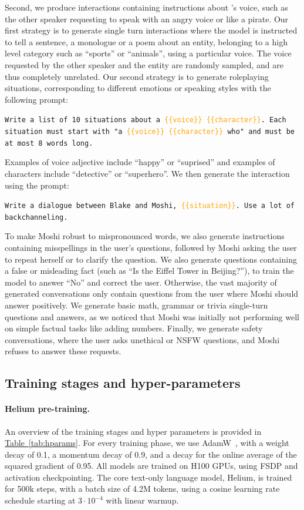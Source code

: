Second, we produce interactions containing instructions about  \ours{}'s voice, such as the other speaker requesting \ours{} to speak with an angry voice or like a pirate.
Our first strategy is to generate single turn interactions where the model is instructed to tell a sentence, a monologue or a poem about an entity, belonging to a high level category such as “sports” or “animals”, using a particular voice.
The voice requested by the other speaker and the entity are randomly sampled, and are thus completely unrelated.
Our second strategy is to generate roleplaying situations, corresponding to different emotions or speaking styles with the following prompt:
\begin{tcolorbox}
  \texttt{Write a list of 10 situations about a \textcolor{orange}{\{\{voice\}\} \{\{character\}\}}. Each situation must start with "a \textcolor{orange}{\{\{voice\}\} \{\{character\}\}} who" and must be at most 8 words long.}
\end{tcolorbox}
Examples of voice adjective include ``happy'' or ``suprised'' and examples of characters include ``detective'' or ``superhero''.
We then generate the interaction using the prompt:
\begin{tcolorbox}
\texttt{Write a dialogue between Blake and Moshi, \textcolor{orange}{\{\{situation\}\}}. Use a lot of backchanneling.}
\end{tcolorbox}

To make Moshi robust to mispronounced words, we also generate instructions containing misspellings in the user’s questions, followed by Moshi asking the user to repeat herself or to clarify the question.
We also generate questions containing a false or misleading fact (such as “Is the Eiffel Tower in Beijing?”), to train the model to answer “No” and correct the user.
Otherwise, the vast majority of generated conversations only contain questions from the user where Moshi should answer positively.
We generate basic math, grammar or trivia single-turn questions and answers, as we noticed that Moshi was initially not performing well on simple factual tasks like adding numbers.
Finally, we generate safety conversations, where the user asks unethical or NSFW questions, and Moshi refuses to answer these requests.

\subsection{Training stages and hyper-parameters}

\paragraph{Helium pre-training.}
An overview of the training stages and hyper parameters is provided in \hyperref[tab:hparams]{Table~\ref{tab:hparams}}.
For every training phase, we use AdamW~\citep{adamw}, with a weight decay of 0.1, a momentum decay of 0.9, and a decay for the online average of the squared gradient of 0.95. All models are trained on H100 GPUs, using FSDP and activation checkpointing. The core text-only language model, Helium, is trained for 500k steps, with a batch size of 4.2M tokens, using a cosine learning rate schedule starting at $3\cdot 10^{-4}$ with linear warmup.

